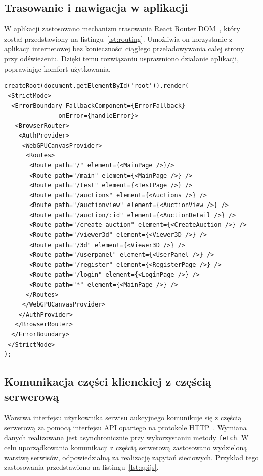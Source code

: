 \subsection{Trasowanie i nawigacja w aplikacji}

W aplikacji zastosowano mechanizm trasowania React Router DOM~\cite{react-router}, który został przedstawiony na listingu~\ref{lst:routing}. Umożliwia on korzystanie z aplikacji internetowej bez konieczności ciągłego przeładowywania całej strony przy odświeżeniu. Dzięki temu rozwiązaniu usprawniono działanie aplikacji, poprawiając komfort użytkowania.

\begin{lstlisting}[style=javascript, caption = {Mechanizm routingu React Router DOM}, label = {lst:routing}]
createRoot(document.getElementById('root')).render(
 <StrictMode>
  <ErrorBoundary FallbackComponent={ErrorFallback} 
  			   onError={handleError}>
   <BrowserRouter>
    <AuthProvider>
     <WebGPUCanvasProvider>
      <Routes>
       <Route path="/" element={<MainPage />}/>
       <Route path="/main" element={<MainPage />} />
       <Route path="/test" element={<TestPage />} />
       <Route path="/auctions" element={<Auctions />} />
       <Route path="/auctionview" element={<AuctionView />} />
       <Route path="/auction/:id" element={<AuctionDetail />} />
       <Route path="/create-auction" element={<CreateAuction />} />
       <Route path="/viewer3d" element={<Viewer3D />} />
       <Route path="/3d" element={<Viewer3D />} />
       <Route path="/userpanel" element={<UserPanel />} />
       <Route path="/register" element={<RegisterPage />} />
       <Route path="/login" element={<LoginPage />} />
       <Route path="*" element={<MainPage />} />
      </Routes>
     </WebGPUCanvasProvider>
    </AuthProvider>
   </BrowserRouter>
  </ErrorBoundary>
 </StrictMode>
);
\end{lstlisting}


\subsection{Komunikacja części klienckiej z częścią serwerową}
Warstwa interfejsu użytkownika serwisu aukcyjnego komunikuje się z częścią serwerową za pomocą interfejsu API opartego na protokole HTTP~\cite{http}. Wymiana danych realizowana jest asynchronicznie przy wykorzystaniu metody \texttt{fetch}. W celu uporządkowania komunikacji z częścią serwerową zastosowano wydzieloną warstwę serwisów, odpowiedzialną za realizację zapytań sieciowych. Przykład tego zastosowania przedstawiono na listingu~\ref{lst:apijs}.

